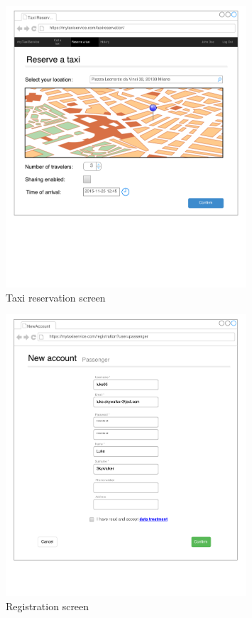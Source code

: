 \begin{figure}
\centering
\includegraphics[width=0.8\textwidth]{mockup/web/TaxiReservationBrowser}
\caption{Taxi reservation screen}
\label{fig:mockup-reservation-browser}
\end{figure}

\begin{figure}
\centering
\includegraphics[width=0.8\textwidth]{mockup/web/Registration}
\caption{Registration screen}
\label{fig:mockup-registration}
\end{figure}

